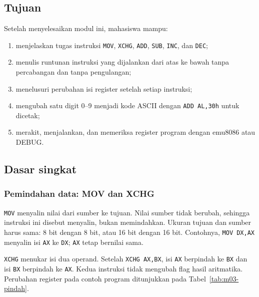 
\subsection{Tujuan}

\begin{tujuan}
Setelah menyelesaikan modul ini, mahasiswa mampu:
\begin{enumerate}
    \item menjelaskan tugas instruksi \texttt{MOV}, \texttt{XCHG},
          \texttt{ADD}, \texttt{SUB}, \texttt{INC}, dan \texttt{DEC};
    \item menulis runtunan instruksi yang dijalankan dari atas ke
          bawah tanpa percabangan dan tanpa pengulangan;
    \item menelusuri perubahan isi register setelah setiap instruksi;
    \item mengubah satu digit 0--9 menjadi kode ASCII dengan
          \texttt{ADD AL,30h} untuk dicetak;
    \item merakit, menjalankan, dan memeriksa register program dengan
          emu8086 atau DEBUG.
\end{enumerate}
\end{tujuan}

\subsection{Dasar singkat}

\subsubsection*{Pemindahan data: MOV dan XCHG}

\texttt{MOV} menyalin nilai dari sumber ke tujuan. Nilai sumber tidak
berubah, sehingga instruksi ini disebut menyalin, bukan memindahkan.
Ukuran tujuan dan sumber harus sama: 8 bit dengan 8 bit, atau 16 bit
dengan 16 bit. Contohnya, \texttt{MOV DX,AX} menyalin isi \texttt{AX}
ke \texttt{DX}; \texttt{AX} tetap bernilai sama.

\texttt{XCHG} menukar isi dua operand. Setelah
\texttt{XCHG AX,BX}, isi \texttt{AX} berpindah ke \texttt{BX} dan isi
\texttt{BX} berpindah ke \texttt{AX}. Kedua instruksi tidak mengubah
flag hasil aritmatika. Perubahan register pada contoh program
ditunjukkan pada Tabel~\ref{tab:m03-pindah}.

